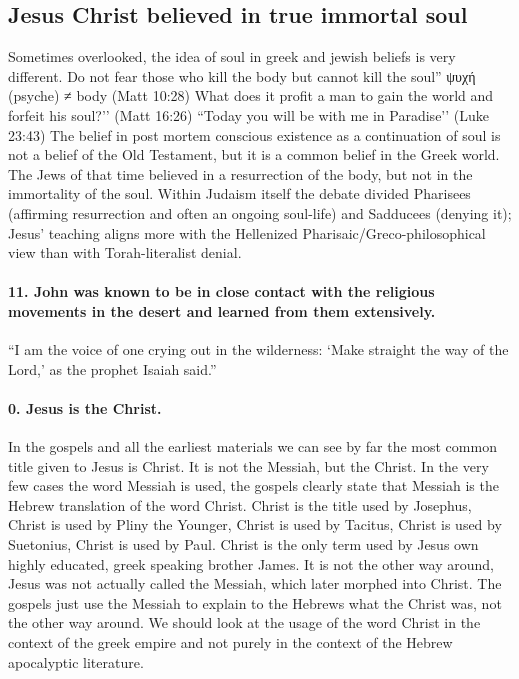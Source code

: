\subsection{Jesus Christ believed in true immortal soul}\label{subsec:jesus-christ-believed-in-true-immortal-soul}
Sometimes overlooked, the idea of soul in greek and jewish beliefs is very different.
Do not fear those who kill the body but cannot kill the soul'' ψυχή (psyche) ≠ body (Matt 10:28) What does it profit a man to gain the world and forfeit his soul?’’ (Matt 16:26) ``Today you will be with me in Paradise’’ (Luke 23:43)
The belief in post mortem conscious existence as a continuation of soul is not a belief of the Old Testament, but it is a common belief in the Greek world.
The Jews of that time believed in a resurrection of the body, but not in the immortality of the soul.
Within Judaism itself the debate divided Pharisees (affirming resurrection and often an ongoing soul-life) and Sadducees (denying it); Jesus’ teaching aligns more with the Hellenized Pharisaic/Greco-philosophical view than with Torah-literalist denial.


\paragraph{11.
John was known to be in close contact with the religious movements in the desert and learned from them extensively.}\label{par:john-was-known-to-be-in-close-contact-with-the-religious-movements-in-the-desert-and-learned-from-them-extensively.}

``I am the voice of one crying out in the wilderness: `Make straight the way of the Lord,' as the prophet Isaiah said.''

\paragraph{0.
Jesus is the Christ.}\label{par:jesus-is-the-christ.}
In the gospels and all the earliest materials we can see by far the most common title given to Jesus is Christ.
It is not the Messiah, but the Christ.
In the very few cases the word Messiah is used, the gospels clearly state that Messiah is the Hebrew translation of the word Christ.
Christ is the title used by Josephus, Christ is used by Pliny the Younger, Christ is used by Tacitus, Christ is used by Suetonius, Christ is used by Paul.
Christ is the only term used by Jesus own highly educated, greek speaking brother James.
It is not the other way around, Jesus was not actually called the Messiah, which later morphed into Christ.
The gospels just use the Messiah to explain to the Hebrews what the Christ was, not the other way around.
We should look at the usage of the word Christ in the context of the greek empire and not purely in the context of the Hebrew apocalyptic literature.

